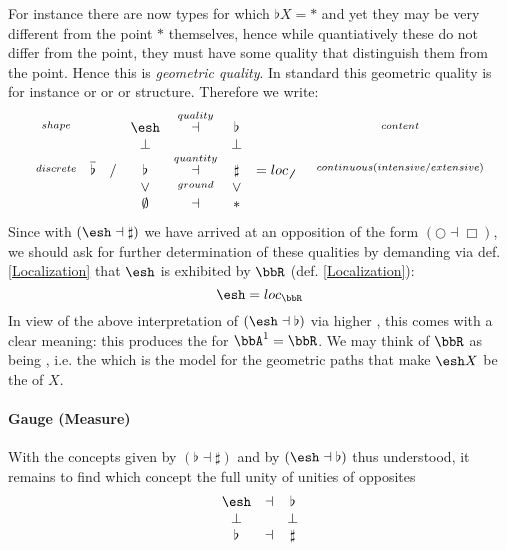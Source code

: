 \documentclass[12pt,titlepage]{article}
\newcommand{\itexarray}[1]{\begin{matrix}#1\end{matrix}}
\theoremstyle{plain}
\theoremstyle{definition}
\theoremstyle{remark}
\begin{document}
For instance there are now types for which $\flat X = \ast$ and yet they may be very different from the point $\ast$ themselves, hence while quantiatively these do not differ from the point, they must have some quality that distinguish them from the point. Hence this  is \emph{geometric quality}. In standard  this geometric quality is for instance  or  or  or  structure.
Therefore we write:
\begin{displaymath}
\itexarray{
\stackrel{shape}{} && & \esh  &\stackrel{quality}{\dashv}& \flat &  & & \stackrel{content}{}
\\
&& & \bot &\stackrel{}{}& \bot
\\
\stackrel{discrete}{} &\overline{\flat}& / & \flat &\stackrel{quantity}{\dashv}& \sharp & = loc_{\not\not}  &   & \stackrel{continuous (intensive/extensive)}{}
\\
&& & \vee &\stackrel{ground}{}& \vee
\\
&& & \emptyset &\dashv& \ast &
}
\end{displaymath}
Since with $(\esh  \dashv \sharp)$ we have arrived at an opposition of the form $(\bigcirc \dashv \Box)$, we should ask for further determination of these qualities by demanding via def. \ref{Localization} that $\esh $ is exhibited by $\bbR$ (def. \ref{Localization}):
\begin{displaymath}
\esh  = loc_{\bbR}
\end{displaymath}
In view of the above interpretation of $(\esh \dashv \flat)$ via higher , this comes with a clear meaning: this produces the  for $\bbA^1 = \bbR$. We may think of $\bbR$ as being , i.e. the  which is the model for the geometric paths that make $\esh X$ be the  of $X$.
\hypertarget{gauge_measure}{}\paragraph*{{Gauge (Measure)}}\label{gauge_measure}
With the concepts given by $(\flat \dashv \sharp)$ and by $(\esh  \dashv \flat)$ thus understood, it remains to find which concept the full unity of unities of opposites
\begin{displaymath}
\itexarray{
\esh  &\dashv& \flat
\\
\bot && \bot
\\
\flat &\dashv& \sharp
}
\end{displaymath}
\end{document}

